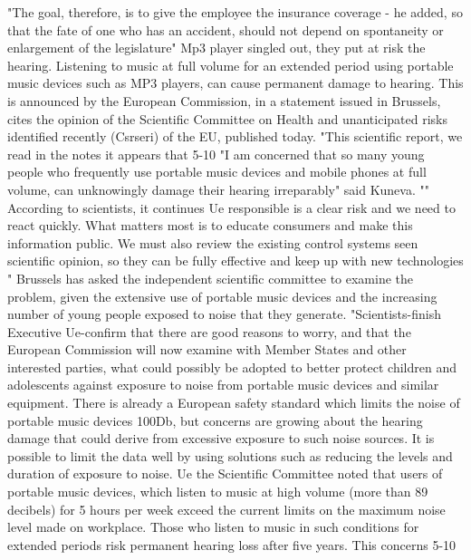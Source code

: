 "The goal, therefore, is to give the employee the insurance coverage - he added, so that the fate of one who has an accident, should not depend on spontaneity or enlargement of the legislature"
Mp3 player singled out, they put at risk the hearing.
Listening to music at full volume for an extended period using portable music devices such as MP3 players, can cause permanent damage to hearing.
This is announced by the European Commission, in a statement issued in Brussels, cites the opinion of the Scientific Committee on Health and unanticipated risks identified recently (Csrseri) of the EU, published today.
"This scientific report, we read in the notes it appears that 5-10%
"I am concerned that so many young people who frequently use portable music devices and mobile phones at full volume, can unknowingly damage their hearing irreparably" said Kuneva.
"" According to scientists, it continues Ue responsible is a clear risk and we need to react quickly.
What matters most is to educate consumers and make this information public.
We must also review the existing control systems seen scientific opinion, so they can be fully effective and keep up with new technologies "
Brussels has asked the independent scientific committee to examine the problem, given the extensive use of portable music devices and the increasing number of young people exposed to noise that they generate.
"Scientists-finish Executive Ue-confirm that there are good reasons to worry, and that the European Commission will now examine with Member States and other interested parties, what could possibly be adopted to better protect children and adolescents against exposure to noise from portable music devices and similar equipment.
There is already a European safety standard which limits the noise of portable music devices 100Db, but concerns are growing about the hearing damage that could derive from excessive exposure to such noise sources.
It is possible to limit the data well by using solutions such as reducing the levels and duration of exposure to noise.
Ue the Scientific Committee noted that users of portable music devices, which listen to music at high volume (more than 89 decibels) for 5 hours per week exceed the current limits on the maximum noise level made on workplace.
Those who listen to music in such conditions for extended periods risk permanent hearing loss after five years.
This concerns 5-10%
